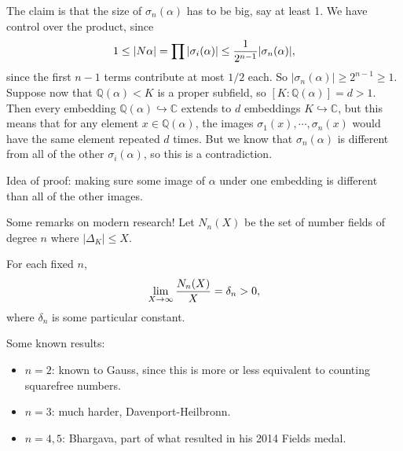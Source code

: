 \begin{remark}
The claim is that the size of \(\sigma_n( \alpha)\) has to be big, say
at least 1. We have control over the product, since
\begin{align*}
1\leq {\left\lvert {N \alpha} \right\rvert} 
= \prod {\left\lvert { \sigma_i( \alpha)} \right\rvert} 
\leq {1\over 2^{n-1}} {\left\lvert { \sigma_n( \alpha)} \right\rvert}
,\end{align*}
since the first \(n-1\) terms contribute at most \(1/2\) each. So
\({\left\lvert {\sigma_n( \alpha)} \right\rvert} \geq 2^{n-1} \geq 1\).
Suppose now that \({\mathbb{Q}}(\alpha) < K\) is a proper subfield, so
\([K : {\mathbb{Q}}( \alpha)] = d > 1\). Then every embedding
\({\mathbb{Q}}(\alpha) \hookrightarrow{\mathbb{C}}\) extends to \(d\)
embeddings \(K\hookrightarrow{\mathbb{C}}\), but this means that for any
element \(x \in {\mathbb{Q}}(\alpha)\), the images
\(\sigma_1(x),\cdots, \sigma_n(x)\) would have the same element repeated
\(d\) times. But we know that \(\sigma_n( \alpha)\) is different from
all of the other \(\sigma_i( \alpha)\), so this is a contradiction.

\end{remark}

\begin{remark}

Idea of proof: making sure some image of \(\alpha\) under one embedding
is different than all of the other images.

\end{remark}

\begin{remark}

Some remarks on modern research! Let \(N_n(X)\) be the set of number
fields of degree \(n\) where
\({\left\lvert {{\Delta}_K} \right\rvert} \leq X\).

\end{remark}

\begin{conjecture}

For each fixed \(n\),
\begin{align*}
\lim_{X\to \infty} {N_n(X) \over X} = \delta_n > 0
,\end{align*}
where \(\delta_n\) is some particular constant.

Some known results:

\begin{itemize}
\tightlist
\item
  \(n=2\): known to Gauss, since this is more or less equivalent to
  counting squarefree numbers.
\item
  \(n=3\): much harder, Davenport-Heilbronn.
\item
  \(n=4, 5\): Bhargava, part of what resulted in his 2014 Fields medal.
\end{itemize}

\end{conjecture}

